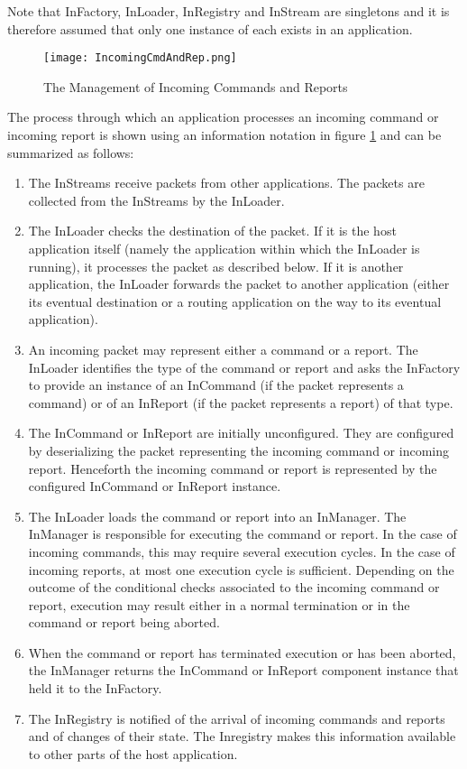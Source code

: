 Note that InFactory, InLoader, InRegistry and InStream are singletons and it is
therefore assumed that only one instance of each exists in an application. 

\begin{figure}[h]
 \centering
 \texttt{[image: IncomingCmdAndRep.png]}
 \caption{The Management of Incoming Commands and Reports}
 \label{fig:IncomingCmdAndRep}
\end{figure}

The process through which an application processes an incoming command or incoming report is shown using an information notation in figure \ref{fig:IncomingCmdAndRep} and can be summarized as follows:
\begin{enumerate}
\item The InStreams receive packets from other applications. The packets are collected from the InStreams by the InLoader.
\item The InLoader checks the destination of the packet. If it is the host application itself (namely the application within which the InLoader is running), it processes the packet as described below. If it is another application, the InLoader forwards the packet to another application (either its eventual destination or a routing application on the way to its eventual application).
\item An incoming packet may represent either a command or a report. The InLoader identifies the type of the command or report and asks the InFactory to provide an instance of an InCommand (if the packet represents a command) or of an InReport (if the packet represents a report) of that type. 
\item The InCommand or InReport are initially unconfigured. They are configured by deserializing the packet representing the incoming command or incoming report. Henceforth the incoming command or report is represented by the configured InCommand or InReport instance. 
\item The InLoader loads the command or report into an InManager. The InManager is responsible for executing the command or report. In the case of incoming commands, this may require several execution cycles. In the case of incoming reports, at most one execution cycle is sufficient. Depending on the outcome of the conditional checks associated to the incoming command or report, execution may result either in a normal termination or in the command or report being aborted.
\item When the command or report has terminated execution or has been aborted, the InManager returns the InCommand or InReport component instance that held it to the InFactory.
\item The InRegistry is notified of the arrival of incoming commands and reports and of changes of their state. The Inregistry makes this information available to other parts of the host application.
\end{enumerate}

